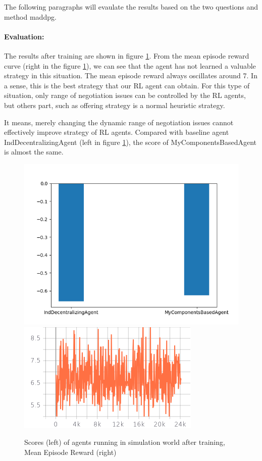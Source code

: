 The following paragraphs will evaulate the results based on the two questions and method maddpg. 

\paragraph{Evaluation:} The results after training are shown in figure \ref{fig:dynamical-range-issues-maddpg}. From the mean episode reward curve (right in the figure \ref{fig:dynamical-range-issues-maddpg}), we can see that the agent has not learned a valuable strategy in this situation. The mean episode reward always oscillates around 7. In a sense, this is the best strategy that our RL agent can obtain. For this type of situation,  only range of negotiation issues can be controlled by the RL agents, but others part, such as offering strategy is a normal heuristic strategy.

It means, merely changing the dynamic range of negotiation issues cannot effectively improve strategy of RL agents. Compared with baseline agent IndDecentralizingAgent (left in figure \ref{fig:dynamical-range-issues-maddpg}), the score of MyComponentsBasedAgent is almost the same.  

\begin{figure}
    \includegraphics[width=.45\textwidth]{./images/dynamic_range_issues_maddpg.png}\hfill
    \includegraphics[width=.49\textwidth]{./images/dynamical_mean_episode_reward.png}
    \caption{Scores (left) of agents running in simulation world after training, Mean Episode Reward (right)}
		\label{fig:dynamical-range-issues-maddpg}
\end{figure}


